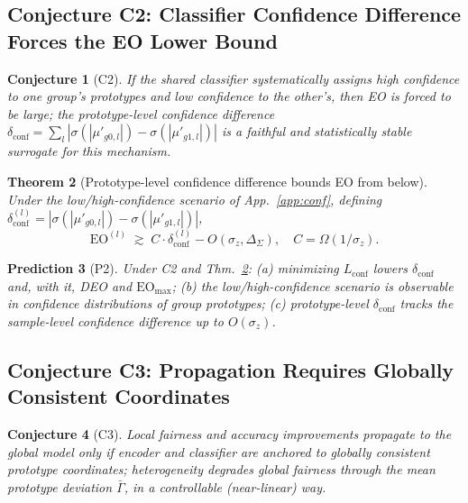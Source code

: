 \documentclass{article}
\newtheorem{theorem}{Theorem}
\newtheorem{conjecture}[theorem]{Conjecture}
\newtheorem{prediction}[theorem]{Prediction}
\newcommand{\sigm}{\sigma}
\begin{document}
\subsection{Conjecture C2: Classifier Confidence Difference Forces the EO Lower Bound}
\label{sec:c2}
\begin{conjecture}[C2]\label{conj:c2}
If the shared classifier systematically assigns high confidence to one
group's prototypes and low confidence to the other's, then EO is forced to
be large; the prototype-level confidence difference
$\delta_{\mathrm{conf}} = \sum_l |\sigma(|\mu'_{g0,l}|) - \sigma(|\mu'_{g1,l}|)|$
is a faithful and statistically stable surrogate for this mechanism.
\end{conjecture}

\begin{theorem}[Prototype-level confidence difference bounds EO from below]\label{thm:conf_lb}
Under the low/high-confidence scenario of App.~\ref{app:conf}, defining
$\delta_{\mathrm{conf}}^{(l)} = |\sigma(|\mu'_{g0,l}|) - \sigma(|\mu'_{g1,l}|)|$,
\[
\mathrm{EO}^{(l)} \;\gtrsim\; C \cdot \delta_{\mathrm{conf}}^{(l)} - O(\sigm_z, \Delta_\Sigma),
\quad C = \Omega(1/\sigm_z).
\]
\end{theorem}

\begin{prediction}[P2]\label{pred:p2}
Under C2 and Thm.~\ref{thm:conf_lb}: (a) minimizing $L_{\mathrm{conf}}$
lowers $\delta_{\mathrm{conf}}$ and, with it, DEO and
$\mathrm{EO}_{\max}$; (b) the low/high-confidence scenario is observable in
confidence distributions of group prototypes; (c) prototype-level
$\delta_{\mathrm{conf}}$ tracks the sample-level confidence difference up to
$O(\sigm_z)$.
\end{prediction}

\subsection{Conjecture C3: Propagation Requires Globally Consistent Coordinates}
\label{sec:c3}
\begin{conjecture}[C3]\label{conj:c3}
Local fairness and accuracy improvements propagate to the global model only
if encoder and classifier are anchored to globally consistent prototype
coordinates; heterogeneity degrades global fairness through the mean
prototype deviation $\bar\Gamma$, in a controllable (near-linear) way.
\end{conjecture}
\end{document}
